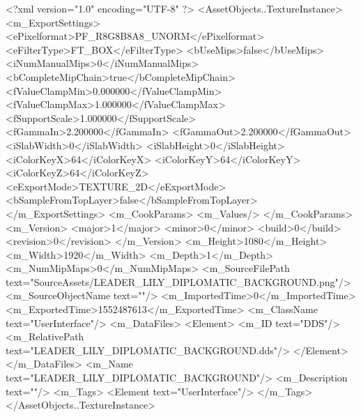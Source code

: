<?xml version="1.0" encoding="UTF-8" ?>
<AssetObjects..TextureInstance>
	<m_ExportSettings>
		<ePixelformat>PF_R8G8B8A8_UNORM</ePixelformat>
		<eFilterType>FT_BOX</eFilterType>
		<bUseMips>false</bUseMips>
		<iNumManualMips>0</iNumManualMips>
		<bCompleteMipChain>true</bCompleteMipChain>
		<fValueClampMin>0.000000</fValueClampMin>
		<fValueClampMax>1.000000</fValueClampMax>
		<fSupportScale>1.000000</fSupportScale>
		<fGammaIn>2.200000</fGammaIn>
		<fGammaOut>2.200000</fGammaOut>
		<iSlabWidth>0</iSlabWidth>
		<iSlabHeight>0</iSlabHeight>
		<iColorKeyX>64</iColorKeyX>
		<iColorKeyY>64</iColorKeyY>
		<iColorKeyZ>64</iColorKeyZ>
		<eExportMode>TEXTURE_2D</eExportMode>
		<bSampleFromTopLayer>false</bSampleFromTopLayer>
	</m_ExportSettings>
	<m_CookParams>
		<m_Values/>
	</m_CookParams>
	<m_Version>
		<major>1</major>
		<minor>0</minor>
		<build>0</build>
		<revision>0</revision>
	</m_Version>
	<m_Height>1080</m_Height>
	<m_Width>1920</m_Width>
	<m_Depth>1</m_Depth>
	<m_NumMipMaps>0</m_NumMipMaps>
	<m_SourceFilePath text="SourceAssets/LEADER_LILY_DIPLOMATIC_BACKGROUND.png"/>
	<m_SourceObjectName text=""/>
	<m_ImportedTime>0</m_ImportedTime>
	<m_ExportedTime>1552487613</m_ExportedTime>
	<m_ClassName text="UserInterface"/>
	<m_DataFiles>
		<Element>
			<m_ID text="DDS"/>
			<m_RelativePath text="LEADER_LILY_DIPLOMATIC_BACKGROUND.dds"/>
		</Element>
	</m_DataFiles>
	<m_Name text="LEADER_LILY_DIPLOMATIC_BACKGROUND"/>
	<m_Description text=""/>
	<m_Tags>
		<Element text="UserInterface"/>
	</m_Tags>
</AssetObjects..TextureInstance>

